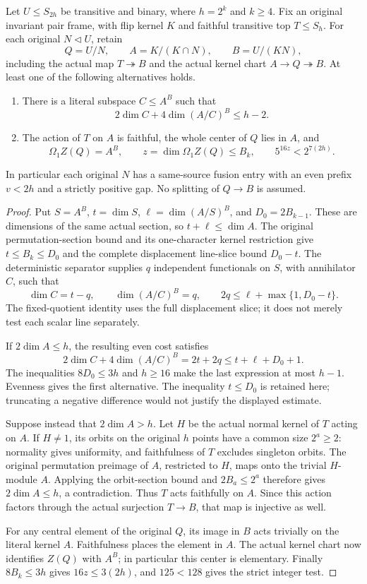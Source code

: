 \begin{theorem}
\label{thm:binary-original-cut-or-character}
Let $U\leq S_{2h}$ be transitive and binary, where $h=2^k$ and
$k\geq4$. Fix an original invariant pair frame, with flip kernel $K$
and faithful transitive top $T\leq S_h$. For each original
$N\lhd U$, retain
\[
 Q=U/N,\qquad A=K/(K\cap N),\qquad B=U/(KN),
\]
including the actual map $T\twoheadrightarrow B$ and the actual
kernel chart $A\longrightarrow Q\twoheadrightarrow B$.
At least one of the following alternatives holds.
\begin{enumerate}
\item There is a literal subspace $C\leq A^B$ such that
\[
 2\dim C+4\dim(A/C)^B\leq h-2.
\]
\item The action of $T$ on $A$ is faithful, the whole center of $Q$
lies in $A$, and
\[
 \Omega_1Z(Q)=A^B,\qquad
 z=\dim\Omega_1Z(Q)\leq B_k,\qquad
 5^{16z}<2^{7(2h)}.
\]
\end{enumerate}
In particular each original $N$ has a same-source fusion entry with
an even prefix $v<2h$ and a strictly positive gap. No splitting of
$Q\to B$ is assumed.
\end{theorem}
\begin{proof}
Put $S=A^B$, $t=\dim S$, $\ell=\dim(A/S)^B$, and
$D_0=2B_{k-1}$. These are dimensions of the same actual section, so
$t+\ell\leq\dim A$. The original permutation-section bound and its
one-character kernel restriction give
$t\leq B_k\leq D_0$ and the complete displacement line-slice bound
$D_0-t$. The deterministic separator supplies $q$ independent
functionals on $S$, with annihilator $C$, such that
\[
 \dim C=t-q,\qquad \dim(A/C)^B=q,\qquad
 2q\leq\ell+\max\{1,D_0-t\}.
\]
The fixed-quotient identity uses the full displacement slice; it
does not merely test each scalar line separately.

If $2\dim A\leq h$, the resulting even cost satisfies
\[
 2\dim C+4\dim(A/C)^B=2t+2q
 \leq t+\ell+D_0+1.
\]
The inequalities $8D_0\leq3h$ and $h\geq16$ make the last expression
at most $h-1$. Evenness gives the first alternative. The inequality
$t\leq D_0$ is retained here; truncating a negative difference would
not justify the displayed estimate.

Suppose instead that $2\dim A>h$. Let $H$ be the actual normal kernel
of $T$ acting on $A$. If $H\ne1$, its orbits on the original $h$
points have a common size $2^a\geq2$: normality gives uniformity,
and faithfulness of $T$ excludes singleton orbits. The original
permutation preimage of $A$, restricted to $H$, maps onto the trivial
$H$-module $A$. Applying the orbit-section bound and
$2B_a\leq2^a$ therefore gives $2\dim A\leq h$, a contradiction.
Thus $T$ acts faithfully on $A$. Since this action factors through
the actual surjection $T\to B$, that map is injective as well.

For any central element of the original $Q$, its image in $B$ acts
trivially on the literal kernel $A$. Faithfulness places the element
in $A$. The actual kernel chart now identifies $Z(Q)$ with $A^B$;
in particular this center is elementary. Finally $8B_k\leq3h$ gives
$16z\leq3(2h)$, and $125<128$ gives the strict integer test.
\end{proof}

